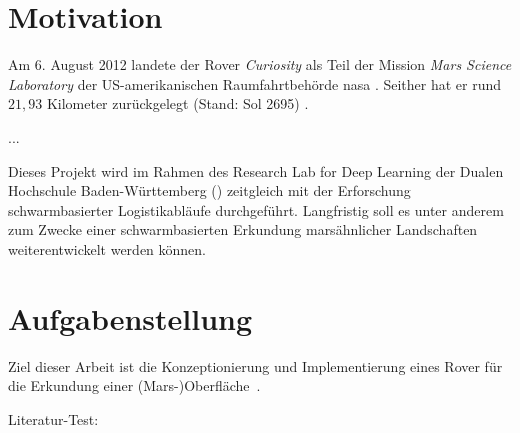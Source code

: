 



\section{Motivation}
\label{sec:motivation}

Am 6. August 2012 landete der Rover \textit{Curiosity} als Teil der Mission \textit{Mars Science Laboratory} der US-amerikanischen Raumfahrtbehörde \acf{nasa} \cite{vasavada2014}.
Seither hat er rund $21{,}93$ Kilometer zurückgelegt (Stand: Sol 2695) \cite{nasa2020}.

...

Dieses Projekt wird im Rahmen des Research Lab for Deep Learning der Dualen Hochschule Baden-Württemberg () zeitgleich mit der Erforschung schwarmbasierter Logistikabläufe durchgeführt.
Langfristig soll es unter anderem zum Zwecke einer schwarmbasierten Erkundung marsähnlicher Landschaften weiterentwickelt werden können.

\section{Aufgabenstellung}
\label{sec:aufgabe}

Ziel dieser Arbeit ist die \glqq Konzeptionierung und Implementierung eines Rover für die Erkundung einer (Mars-)Oberfläche\grqq\ \cite{mueller2019}.

Literatur-Test:
\cite{yamanoor2017}
\cite{horan2013}
\cite{molloy2016}
\cite{donat2018}
\cite{halfacree2019}
\cite{cole2013}
\cite{mcmanus2017}
\cite{cox2014}
\cite{pajankar2015}
\cite{pagnutti2017}